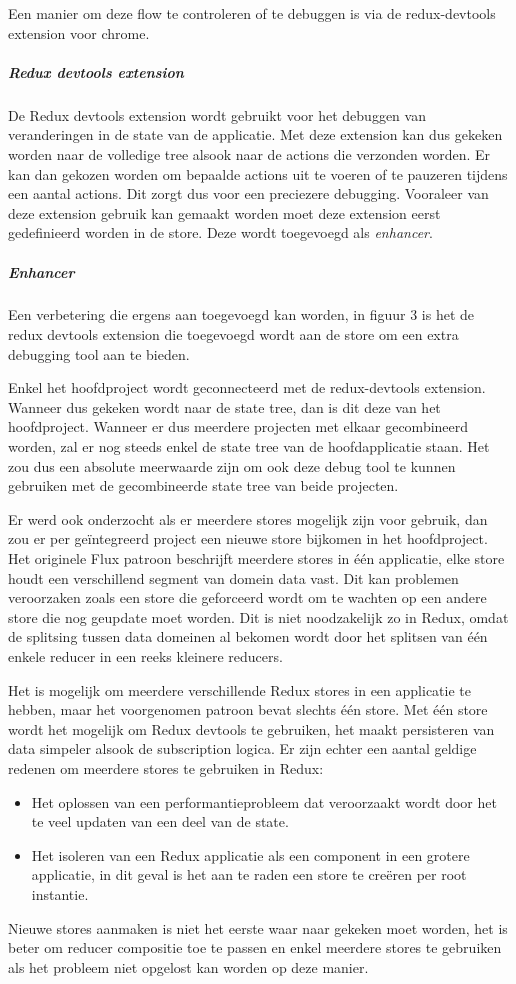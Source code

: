 Een manier om deze flow te controleren of te debuggen is via de redux-devtools extension voor chrome. 

\subparagraph{Redux devtools extension}
De Redux devtools extension wordt gebruikt voor het debuggen van veranderingen in de state van de applicatie. Met deze extension kan dus gekeken worden naar de volledige tree alsook naar de actions die verzonden worden. Er kan dan gekozen worden om bepaalde actions uit te voeren of te pauzeren tijdens een aantal actions. Dit zorgt dus voor een preciezere debugging. Vooraleer van deze extension gebruik kan gemaakt worden moet deze extension eerst gedefinieerd worden in de store. Deze wordt toegevoegd als \textit{enhancer}. 

\subparagraph{Enhancer}
Een verbetering die ergens aan toegevoegd kan worden, in figuur 3 is het de redux devtools extension die toegevoegd wordt aan de store om een extra debugging tool aan te bieden.

Enkel het hoofdproject wordt geconnecteerd met de redux-devtools extension. Wanneer dus gekeken wordt naar de state tree, dan is dit deze van het hoofdproject. Wanneer er dus meerdere projecten met elkaar gecombineerd worden, zal er nog steeds enkel de state tree van de hoofdapplicatie staan. Het zou dus een absolute meerwaarde zijn om ook deze debug tool te kunnen gebruiken met de gecombineerde state tree van beide projecten.
\autocite{devtools}

Er werd ook onderzocht als er meerdere stores mogelijk zijn voor gebruik, dan zou er per geïntegreerd project een nieuwe store bijkomen in het hoofdproject.
Het originele Flux patroon beschrijft meerdere stores in één applicatie, elke store houdt een verschillend segment van domein data vast. Dit kan problemen veroorzaken zoals een store die geforceerd wordt om te wachten op een andere store die nog geupdate moet worden. Dit is niet noodzakelijk zo in Redux, omdat de splitsing tussen data domeinen al bekomen wordt door het splitsen van één enkele reducer in een reeks kleinere reducers.

Het is mogelijk om meerdere verschillende Redux stores in een applicatie te hebben, maar het voorgenomen patroon bevat slechts één store. Met één store wordt het mogelijk om Redux devtools te gebruiken, het maakt persisteren van data simpeler alsook de subscription logica. Er zijn echter een aantal geldige redenen om meerdere stores te gebruiken in Redux:
\begin{itemize}
	\item Het oplossen van een performantieprobleem dat veroorzaakt wordt door het te veel updaten van een deel van de state.
	\item Het isoleren van een Redux applicatie als een component in een grotere applicatie, in dit geval is het aan te raden een store te creëren per root instantie.
\end{itemize}
Nieuwe stores aanmaken is niet het eerste waar naar gekeken moet worden, het is beter om reducer compositie toe te passen en enkel meerdere stores te gebruiken als het probleem niet opgelost kan worden op deze manier.

